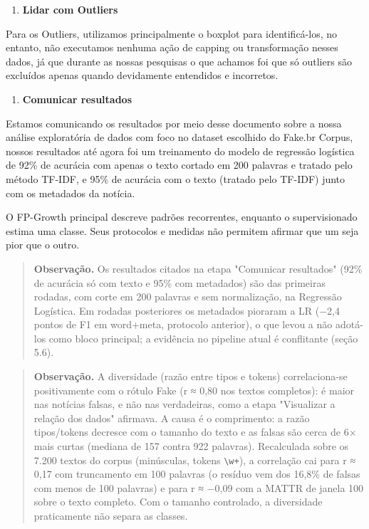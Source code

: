 \documentclass[
  brazilian,
  11pt,
]{article}
\providecommand{\tightlist}{%
  \setlength{\itemsep}{0pt}\setlength{\parskip}{0pt}}
\begin{document}
\begin{enumerate}
\def\labelenumi{\arabic{enumi}.}
\tightlist
\setcounter{enumi}{6}
\item
  \textbf{Lidar com Outliers}
\end{enumerate}

Para os Outliers, utilizamos principalmente o boxplot para identificá-los, no entanto, não executamos nenhuma ação de capping ou transformação nesses dados, já que durante as nossas pesquisas o que achamos foi que só outliers são excluídos apenas quando devidamente entendidos e incorretos.

\begin{enumerate}
\def\labelenumi{\arabic{enumi}.}
\tightlist
\setcounter{enumi}{7}
\item
  \textbf{Comunicar resultados}
\end{enumerate}

Estamos comunicando os resultados por meio desse documento sobre a nossa análise exploratória de dados com foco no dataset escolhido do Fake.br Corpus, nossos resultados até agora foi um treinamento do modelo de regressão logística de 92\% de acurácia com apenas o texto cortado em 200 palavras e tratado pelo método TF-IDF, e 95\% de acurácia com o texto (tratado pelo TF-IDF) junto com os metadados da notícia.

O FP-Growth principal descreve padrões recorrentes, enquanto o supervisionado estima uma classe. Seus protocolos e medidas não permitem afirmar que um seja pior que o outro.

\begin{quote}
\textbf{Observação.} Os resultados citados na etapa "Comunicar resultados" (92\% de acurácia só com texto e 95\% com metadados) são das primeiras rodadas, com corte em 200 palavras e sem normalização, na Regressão Logística. Em rodadas posteriores os metadados pioraram a LR (−2,4 pontos de F1 em word+meta, protocolo anterior), o que levou a não adotá-los como bloco principal; a evidência no pipeline atual é conflitante (seção 5.6).
\end{quote}

\begin{quote}
\textbf{Observação.} A diversidade (razão entre tipos e tokens) correlaciona-se positivamente com o rótulo Fake (r ≈ 0,80 nos textos completos): é maior nas notícias falsas, e não nas verdadeiras, como a etapa "Visualizar a relação dos dados" afirmava. A causa é o comprimento: a razão tipos/tokens decresce com o tamanho do texto e as falsas são cerca de 6× mais curtas (mediana de 157 contra 922 palavras). Recalculada sobre os 7.200 textos do corpus (minúsculas, tokens \texttt{\textbackslash w+}), a correlação cai para r ≈ 0,17 com truncamento em 100 palavras (o resíduo vem dos 16,8\% de falsas com menos de 100 palavras) e para r ≈ −0,09 com a MATTR de janela 100 sobre o texto completo. Com o tamanho controlado, a diversidade praticamente não separa as classes.
\end{quote}
\end{document}
